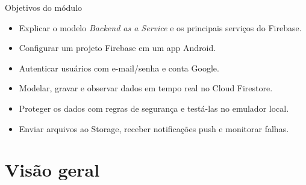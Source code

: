 \documentclass[aspectratio=169,10pt]{beamer}
\begin{document}
\capa

\begin{frame}{Objetivos do módulo}
  \begin{conceito}
    \begin{itemize}
      \item Explicar o modelo \emph{Backend as a Service} e os principais serviços do Firebase.
      \item Configurar um projeto Firebase em um app Android.
      \item Autenticar usuários com e-mail/senha e conta Google.
      \item Modelar, gravar e observar dados em tempo real no Cloud Firestore.
      \item Proteger os dados com regras de segurança e testá-las no emulador local.
      \item Enviar arquivos ao Storage, receber notificações push e monitorar falhas.
    \end{itemize}
  \end{conceito}
\end{frame}

\sumario

\section{Visão geral}
\end{document}
